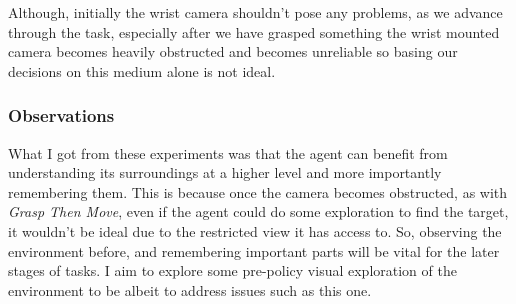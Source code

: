 Although, initially the wrist camera shouldn't pose any problems, as we advance through the task, especially after we have grasped something the wrist mounted camera becomes heavily obstructed and becomes unreliable so basing our decisions on this medium alone is not ideal.

\subsubsection{Observations}
What I got from these experiments was that the agent can benefit from understanding its surroundings at a higher level and more importantly remembering them. This is because once the camera becomes obstructed, as with \emph{Grasp Then Move}, even if the agent could do some exploration to find the target, it wouldn't be ideal due to the restricted view it has access to. So, observing the environment before, and remembering important parts will be vital for the later stages of tasks. I aim to explore some pre-policy visual exploration of the environment to be albeit to address issues such as this one.
